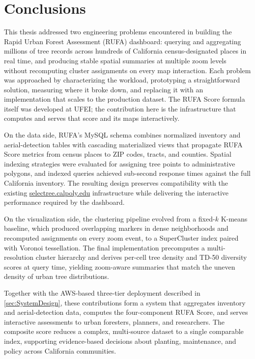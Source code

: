 \chapter{Conclusions} \label{sec:Conclusions}

This thesis addressed two engineering problems encountered in building the Rapid Urban Forest Assessment (RUFA) dashboard: querying and aggregating millions of tree records across hundreds of California census-designated places in real time, and producing stable spatial summaries at multiple zoom levels without recomputing cluster assignments on every map interaction. Each problem was approached by characterizing the workload, prototyping a straightforward solution, measuring where it broke down, and replacing it with an implementation that scales to the production dataset. The RUFA Score formula itself was developed at UFEI; the contribution here is the infrastructure that computes and serves that score and its maps interactively.

On the data side, RUFA's MySQL schema combines normalized inventory and aerial-detection tables with cascading materialized views that propagate RUFA Score metrics from census places to ZIP codes, tracts, and counties. Spatial indexing strategies were evaluated for assigning tree points to administrative polygons, and indexed queries achieved sub-second response times against the full California inventory. The resulting design preserves compatibility with the existing \href{https://selectree.calpoly.edu}{selectree.calpoly.edu} infrastructure while delivering the interactive performance required by the dashboard.

On the visualization side, the clustering pipeline evolved from a fixed-$k$ K-means baseline, which produced overlapping markers in dense neighborhoods and recomputed assignments on every zoom event, to a SuperCluster index paired with Voronoi tessellation. The final implementation precomputes a multi-resolution cluster hierarchy and derives per-cell tree density and TD-50 diversity scores at query time, yielding zoom-aware summaries that match the uneven density of urban tree distributions.

Together with the AWS-based three-tier deployment described in \autoref{sec:SystemDesign}, these contributions form a system that aggregates inventory and aerial-detection data, computes the four-component RUFA Score, and serves interactive assessments to urban foresters, planners, and researchers. The composite score reduces a complex, multi-source dataset to a single comparable index, supporting evidence-based decisions about planting, maintenance, and policy across California communities.

